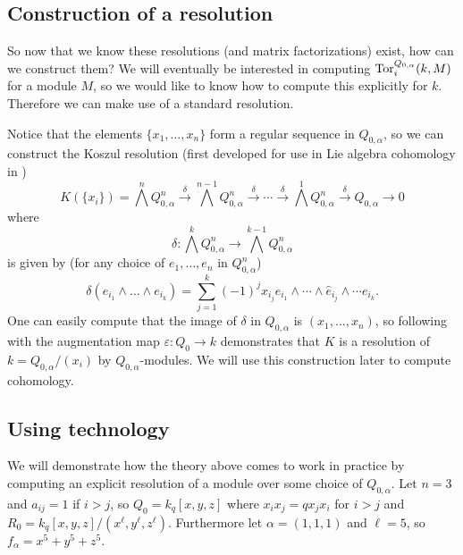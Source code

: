 \documentclass [11pt, proquest] {uwthesis}[2020/02/24]
\begin{document}
\subsection{Construction of a resolution}
    So now that we know these resolutions (and matrix factorizations) exist, how can we construct them? We will eventually be interested in computing $\operatorname{Tor}_i^{Q_{0,\alpha}}(k,M)$ for a module $M$, so we would like to know how to compute this explicitly for $k$. Therefore we can make use of a standard resolution.
    
    Notice that the elements $\{x_1 ,\dots, x_n \}$ form a regular sequence in $Q_{0,\alpha}$, so we can construct the Koszul resolution (first developed for use in Lie algebra cohomology in \cite{koszul-resolution})
    \[K(\{x_i\})=\bigwedge^n Q_{0,\alpha}^n\xrightarrow{\delta} \bigwedge^{n-1}Q_{0,\alpha}^n\xrightarrow{\delta}\cdots\xrightarrow{\delta}\bigwedge^1 Q_{0,\alpha}^n\xrightarrow{\delta} Q_{0,\alpha}\to 0\]
    where
    \[\delta:\bigwedge^k Q_{0,\alpha}^n\to \bigwedge^{k-1}Q_{0,\alpha}^n\]
    is given by (for any choice of $e_1,\dots,e_n$ in $Q_{0,\alpha}^n$)
    \[\delta(e_{i_1}\wedge\dots\wedge e_{i_k})=\sum_{j=1}^k (-1)^jx_{i_j} e_{i_1}\wedge\cdots\wedge\hat e_{i_j}\wedge\cdots e_{i_k}.\]
    One can easily compute that the image of $\delta$ in $Q_{0,\alpha}$ is $(x_1,\dots,x_n)$, so following with the augmentation map $\varepsilon:Q_0\to k$ demonstrates that $K$ is a resolution of $k=Q_{0,\alpha}/(x_i)$ by $Q_{0,\alpha}$-modules. We will use this construction later to compute cohomology.
\subsection{Using technology}
    We will demonstrate how the theory above comes to work in practice by computing an explicit resolution of a module over some choice of $Q_{0,\alpha}$.
    Let $n=3$ and $a_{ij}=1$ if $i>j$, so $Q_0=k_q[x,y,z]$ where $x_ix_j=qx_jx_i$ for $i>j$ and $R_0=k_q[x,y,z]/(x^\ell ,y^\ell ,z^\ell ).$ Furthermore let $\alpha=(1,1,1)$ and $\ell=5$, so $f_\alpha=x^5+y^5+z^5.$ 
    
\end{document}
